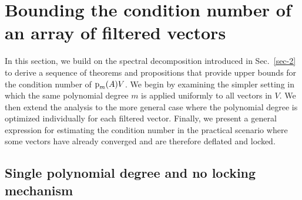 \section{Bounding the condition number of an array of filtered vectors}
\label{sec-3}
In this section, we build on the spectral decomposition introduced in Sec.~\ref{sec-2} to derive a sequence of theorems and propositions that provide upper bounds for the condition number of ${\textrm p}_{m}(A)V$. We begin by examining the simpler setting in which the same polynomial degree $m$ is applied uniformly to all vectors in $V$. We then extend the analysis to the more general case where the polynomial degree is optimized individually for each filtered vector. Finally, we present a general expression for estimating the condition number in the practical scenario where some vectors have already converged and are therefore deflated and locked.


\subsection{Single polynomial degree and no locking mechanism}

